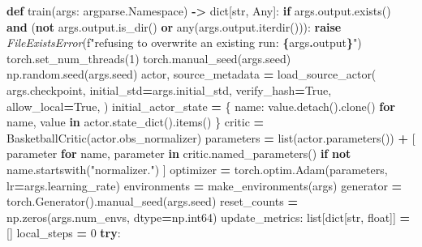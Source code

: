 \documentclass[
  chinese,
  11pt,
  letterpaper,
]{article}
\newenvironment{Shaded}{\begin{snugshade}}{\end{snugshade}}
\newcommand{\BuiltInTok}[1]{#1}
\newcommand{\ControlFlowTok}[1]{\textcolor[rgb]{0.13,0.29,0.53}{\textbf{#1}}}
\newcommand{\DecValTok}[1]{\textcolor[rgb]{0.00,0.00,0.81}{#1}}
\newcommand{\KeywordTok}[1]{\textcolor[rgb]{0.13,0.29,0.53}{\textbf{#1}}}
\newcommand{\NormalTok}[1]{#1}
\newcommand{\OperatorTok}[1]{\textcolor[rgb]{0.81,0.36,0.00}{\textbf{#1}}}
\newcommand{\PreprocessorTok}[1]{\textcolor[rgb]{0.56,0.35,0.01}{\textit{#1}}}
\newcommand{\SpecialCharTok}[1]{\textcolor[rgb]{0.81,0.36,0.00}{\textbf{#1}}}
\newcommand{\SpecialStringTok}[1]{\textcolor[rgb]{0.31,0.60,0.02}{#1}}
\newcommand{\StringTok}[1]{\textcolor[rgb]{0.31,0.60,0.02}{#1}}
\newcommand{\VariableTok}[1]{\textcolor[rgb]{0.00,0.00,0.00}{#1}}
\renewenvironment{Shaded}{\par\smallskip}{\par\smallskip}
\begin{document}
\begin{Shaded}
\begin{Highlighting}[]
\KeywordTok{def}\NormalTok{ train(args: argparse.Namespace) }\OperatorTok{{-}\textgreater{}} \BuiltInTok{dict}\NormalTok{[}\BuiltInTok{str}\NormalTok{, Any]:}
    \ControlFlowTok{if}\NormalTok{ args.output.exists() }\KeywordTok{and}\NormalTok{ (}\KeywordTok{not}\NormalTok{ args.output.is\_dir() }\KeywordTok{or} \BuiltInTok{any}\NormalTok{(args.output.iterdir())):}
        \ControlFlowTok{raise} \PreprocessorTok{FileExistsError}\NormalTok{(}\SpecialStringTok{f"refusing to overwrite an existing run: }\SpecialCharTok{\{}\NormalTok{args}\SpecialCharTok{.}\NormalTok{output}\SpecialCharTok{\}}\SpecialStringTok{"}\NormalTok{)}
\NormalTok{    torch.set\_num\_threads(}\DecValTok{1}\NormalTok{)}
\NormalTok{    torch.manual\_seed(args.seed)}
\NormalTok{    np.random.seed(args.seed)}
\NormalTok{    actor, source\_metadata }\OperatorTok{=}\NormalTok{ load\_source\_actor(}
\NormalTok{        args.checkpoint,}
\NormalTok{        initial\_std}\OperatorTok{=}\NormalTok{args.initial\_std,}
\NormalTok{        verify\_hash}\OperatorTok{=}\VariableTok{True}\NormalTok{,}
\NormalTok{        allow\_local}\OperatorTok{=}\VariableTok{True}\NormalTok{,}
\NormalTok{    )}
\NormalTok{    initial\_actor\_state }\OperatorTok{=}\NormalTok{ \{}
\NormalTok{        name: value.detach().clone() }\ControlFlowTok{for}\NormalTok{ name, value }\KeywordTok{in}\NormalTok{ actor.state\_dict().items()}
\NormalTok{    \}}
\NormalTok{    critic }\OperatorTok{=}\NormalTok{ BasketballCritic(actor.obs\_normalizer)}
\NormalTok{    parameters }\OperatorTok{=} \BuiltInTok{list}\NormalTok{(actor.parameters()) }\OperatorTok{+}\NormalTok{ [}
\NormalTok{        parameter}
        \ControlFlowTok{for}\NormalTok{ name, parameter }\KeywordTok{in}\NormalTok{ critic.named\_parameters()}
        \ControlFlowTok{if} \KeywordTok{not}\NormalTok{ name.startswith(}\StringTok{"normalizer."}\NormalTok{)}
\NormalTok{    ]}
\NormalTok{    optimizer }\OperatorTok{=}\NormalTok{ torch.optim.Adam(parameters, lr}\OperatorTok{=}\NormalTok{args.learning\_rate)}
\NormalTok{    environments }\OperatorTok{=}\NormalTok{ make\_environments(args)}
\NormalTok{    generator }\OperatorTok{=}\NormalTok{ torch.Generator().manual\_seed(args.seed)}
\NormalTok{    reset\_counts }\OperatorTok{=}\NormalTok{ np.zeros(args.num\_envs, dtype}\OperatorTok{=}\NormalTok{np.int64)}
\NormalTok{    update\_metrics: }\BuiltInTok{list}\NormalTok{[}\BuiltInTok{dict}\NormalTok{[}\BuiltInTok{str}\NormalTok{, }\BuiltInTok{float}\NormalTok{]] }\OperatorTok{=}\NormalTok{ []}
\NormalTok{    local\_steps }\OperatorTok{=} \DecValTok{0}
    \ControlFlowTok{try}\NormalTok{:}

\end{Highlighting}
\end{Shaded}
\end{document}
